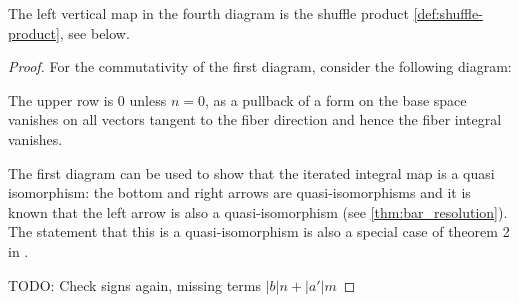 \documentclass{scrartcl}
\theoremstyle{plain}
\theoremstyle{definition}
\newcommand{\abs}[1]{\left\lvert#1\right\rvert}
\DeclareMathOperator{\id}{id}
\begin{document}
The left vertical map in the fourth diagram is the shuffle product \ref{def:shuffle-product}, see below.
\begin{proof}
For the commutativity of the first diagram, consider the following diagram:
\begin{center}
\end{center}
The upper row is $0$ unless $n=0$, as a pullback of a form on the base space vanishes on all vectors tangent to the fiber direction and hence the fiber integral vanishes.

The first diagram can be used to show that the iterated integral map is a quasi isomorphism: the bottom and right arrows are quasi-isomorphisms and it is known that the left arrow is also a quasi-isomorphism (see \ref{thm:bar_resolution}). The statement that this is a quasi-isomorphism is also a special case of theorem 2 in \cite{patras2003cochain}. 

TODO: Check signs again, missing terms $\abs{b}n + \abs{a'} m$


\end{proof}
\end{document}
